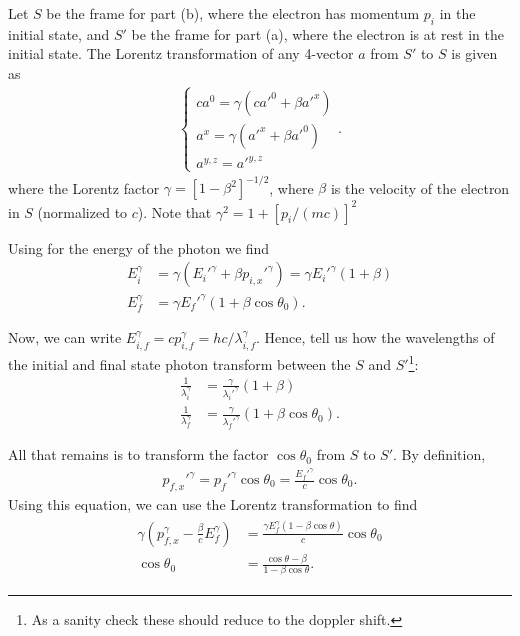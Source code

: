 {Let $S$ be the frame for part (b), where the electron has momentum $p_{i}$ in the initial state, and $S'$ be the frame for part (a), where the electron is at rest in the initial state.
The Lorentz transformation of any 4-vector $a$ from $S'$ to $S$ is given as
\begin{eqnarray}
\label{eq:lorentz-transform}
   \begin{cases}
   c a^{0} = \gamma (c a'^{0} + \beta a'^{x}) \\
   a^{x}  = \gamma (a'^{x} + \beta a'^{0}) \\
   a^{y,z} = a'^{y,z}
   \end{cases} 
.\end{eqnarray}
where the Lorentz factor $\gamma = [1 - \beta^2]^{-1/2}$, where $\beta$ is the velocity of the electron in $S$ (normalized to $c$).
Note that $\gamma^2 = 1 + [p_{i}/(mc)]^2$

Using  for the energy of the photon we find
\begin{align}
    \label{eq:initial-transform}
    E_{i}^{\gamma} &= \gamma ( E_{i}'^{\gamma} + \beta p_{i,x}'^{\gamma} ) = \gamma E_{i}'^{\gamma} (1 + \beta) \\
    \label{eq:final-transform}
    E_{f}^{\gamma} &= \gamma E_{f}'^{\gamma} (1 + \beta \cos{\theta_0})
.\end{align}

Now, we can write $E_{i,f}^{\gamma} = c p_{i,f}^{\gamma} = hc/\lambda_{i,f}^{\gamma}$.
Hence,  tell us how the wavelengths of the initial and final state photon transform between the $S$ and $S'$\footnote{As a sanity check these should reduce to the doppler shift.}:
\begin{align}
    \frac{1}{\lambda_{i}^{\gamma}} &= \frac{\gamma}{\lambda_{i}'^{\gamma}} (1+\beta) \\
    \frac{1}{\lambda_{f}^{\gamma}} &= \frac{\gamma}{\lambda_{f}'^{\gamma}} (1+\beta \cos{\theta_0})
.\end{align}

All that remains is to transform the factor $\cos{\theta_0}$ from $S$ to $S'$.
By definition,
\begin{eqnarray}
    p_{f,x}'^{\gamma} = p_{f}'^{\gamma} \cos{\theta_0} = \frac{E_{f}'^{\gamma}}{c} \cos{\theta_0}
.\end{eqnarray}
Using this equation, we can use the Lorentz transformation to find
\begin{eqnarray}
    \begin{aligned}
        \gamma ( p_{f,x}^{\gamma} - \frac{\beta}{c} E_{f}^{\gamma} ) &= \frac{\gamma E_{f}^{\gamma} ( 1 - \beta \cos{\theta} )}{c} \cos{\theta_0} \\
    \cos{\theta_0} &= \frac{\cos{\theta} - \beta}{1 - \beta \cos{\theta}}
    .\end{aligned}
\end{eqnarray}

}

